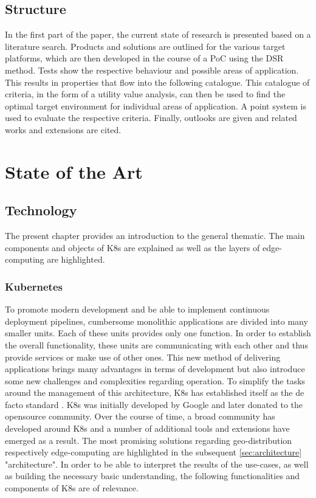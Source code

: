 \documentclass[MIC,Master,english]{twbook}%
\begin{document}
\section{Structure}
\label{sec:methodology}
\label{sec:structure}
In the first part of the paper, the current state of research is presented based on a literature search. Products and solutions are outlined for the various target platforms, which are then developed in the course of a \ac{PoC} using the \ac{DSR} method. Tests show the respective behaviour and possible areas of application. This results in properties that flow into the following catalogue. This catalogue of criteria, in the form of a utility value analysis, can then be used to find the optimal target environment for individual areas of application. A point system is used to evaluate the respective criteria. Finally, outlooks are given and related works and extensions are cited.

\pagebreak
\chapter{State of the Art}
\label{chap:current}
\section{Technology}
The present chapter provides an introduction to the general thematic. The main components and objects of \ac{K8s} are explained as well as the layers of edge-computing are highlighted.

\label{sec:technology}
\subsection{Kubernetes}
To promote modern development and be able to implement continuous deployment pipelines, cumbersome monolithic applications are divided into many smaller units. Each of these units provides only one function. In order to establish the overall functionality, these units are communicating with each other and thus provide services or make use of other ones. This new method of delivering applications brings many advantages in terms of development but also introduce some new challenges and complexities regarding operation. To simplify the tasks around the management of this architecture, \ac{K8s} has established itself as the de facto standard \cite{k8ssurv}. \ac{K8s} was initially developed by Google and later donated to the opensource community. Over the course of time, a broad community has developed around \ac{K8s} and a number of additional tools and extensions have emerged as a result. The most promising solutions regarding geo-distribution respectively edge-computing are highlighted in the subsequent \autoref{sec:architecture} "architecture". In order to be able to interpret the results of the use-cases, as well as building the necessary basic understanding, the following functionalities and components of \ac{K8s} are of relevance. 
\end{document}

